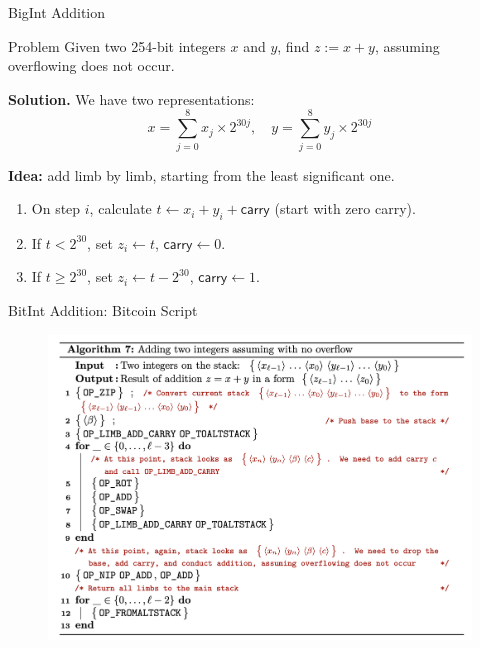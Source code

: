 \documentclass{zkdl-presentation-template}
\begin{document}
    \begin{frame}{BigInt Addition}
        \begin{block}{Problem}
            Given two 254-bit integers $x$ and $y$, find $z := x+y$, assuming overflowing does not occur.\pause
        \end{block}

        \textbf{Solution.} We have two representations:
        \begin{equation*}
            x = \sum_{j=0}^8 x_j \times 2^{30j}, \quad y = \sum_{j=0}^8 y_j \times 2^{30j}
        \end{equation*}

        \pause \textbf{Idea:} add limb by limb, starting from the least significant one.\pause

        \begin{enumerate}
            \item On step $i$, calculate $t \gets x_i + y_i + \mathsf{carry}$ (start with zero carry).\pause
            \item If $t < 2^{30}$, set $z_i \gets t$, $\mathsf{carry} \gets 0$.\pause
            \item If $t \geq 2^{30}$, set $z_i \gets t-2^{30}$, $\mathsf{carry} \gets 1$.
        \end{enumerate}
    \end{frame}

    \begin{frame}{BitInt Addition: Bitcoin Script}
        \begin{figure}
            \centering
            \includegraphics[width=\linewidth]{images/bigint_add.png}
        \end{figure}
    \end{frame}
\end{document}
